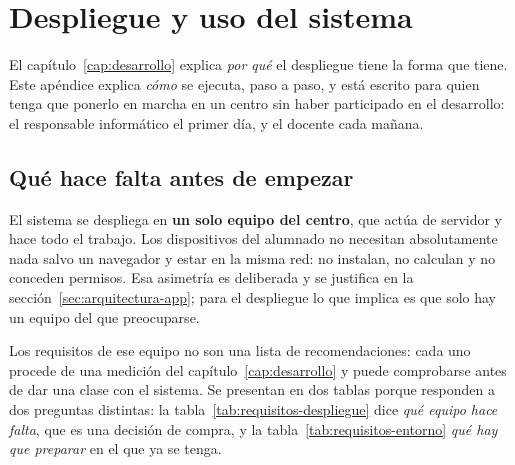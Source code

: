 \chapter{Despliegue y uso del sistema}
\label{ap:despliegue}

El capítulo~\ref{cap:desarrollo} explica \emph{por qué} el despliegue tiene la forma que
tiene. Este apéndice explica \emph{cómo} se ejecuta, paso a paso, y está escrito para quien
tenga que ponerlo en marcha en un centro sin haber participado en el desarrollo: el
responsable informático el primer día, y el docente cada mañana.

\section{Qué hace falta antes de empezar}

El sistema se despliega en \textbf{un solo equipo del centro}, que actúa de servidor y hace
todo el trabajo. Los dispositivos del alumnado no necesitan absolutamente nada salvo un
navegador y estar en la misma red: no instalan, no calculan y no conceden permisos. Esa
asimetría es deliberada y se justifica en la sección~\ref{sec:arquitectura-app}; para el
despliegue lo que implica es que solo hay un equipo del que preocuparse.

Los requisitos de ese equipo no son una lista de recomendaciones: cada uno procede de una
medición del capítulo~\ref{cap:desarrollo} y puede comprobarse antes de dar una clase con el
sistema. Se presentan en dos tablas porque responden a dos preguntas distintas: la
tabla~\ref{tab:requisitos-despliegue} dice \emph{qué equipo hace falta}, que es una decisión
de compra, y la tabla~\ref{tab:requisitos-entorno} \emph{qué hay que preparar} en el que ya
se tenga.

